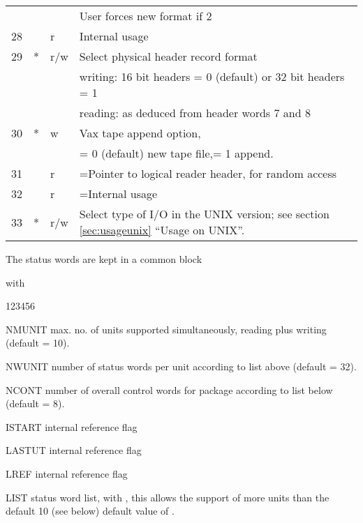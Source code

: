 \begin{longtable}{@{}rllp{.84\linewidth}@{}}
  &   &     & User forces new format if 2                             \\
28&   & r   & Internal usage                                          \\
29& * & r/w & Select physical header record format                    \\
  &   &     & writing: 16 bit headers = 0 (default) or
              32 bit headers = 1                                      \\
  &   &     & reading: as deduced from header words 7 and 8           \\
30& * & w   & Vax tape append option,                                 \\
  &   &     & = 0 (default) new tape file,= 1 append.                 \\
31&   & r   & =Pointer to logical reader header, for random access    \\
32&   & r   & =Internal usage                                         \\
33& * & r/w & Select type of I/O in the UNIX version;
              see section \ref{sec:usageunix} ``Usage on UNIX''.      \\
\end{longtable}

The status words are kept in a common block


with
\begin{DLtt}{123456}
\item[NMUNIT] max. no. of units supported simultaneously, reading plus writing
              (default = 10).
\item[NWUNIT] number of status words per unit according to list above
              (default = 32).
\item[NCONT]  number of overall control words for package 
              according to list below (default = 8).
\item[ISTART] internal reference flag
\item[LASTUT] internal reference flag
\item[LREF]   internal reference flag
\item[LIST]   status word list, with , 
              this allows the support of more units than the default 10 
              (see below) default value of .
\end{DLtt}
 
